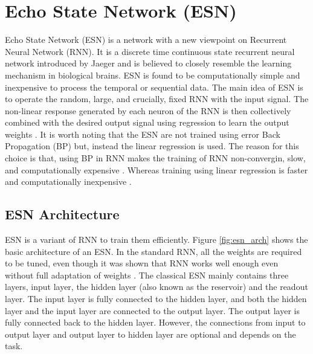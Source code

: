 \section{Echo State Network (ESN)}

Echo State Network (ESN) is a network with a new viewpoint on Recurrent Neural Network (RNN). It is a discrete time continuous state recurrent neural network introduced by Jaeger \cite{esn:jaeger:2001} and is believed to closely resemble the learning mechanism in biological brains. ESN is found to be computationally simple and inexpensive to process the temporal or sequential data. The main idea of ESN is to operate the random, large, and crucially, fixed RNN with the input signal. The non-linear response generated by each neuron of the RNN is then collectively combined with the desired output signal using regression to learn the output weights \cite{esn:jaeger_tutorial, esn:jaeger:2001,esn:scholarpedia:2007}. It is worth noting that the ESN are not trained using error Back Propagation (BP) \cite{back_propagation} but, instead the linear regression is used. The reason for this choice is that, using BP in RNN makes the training of RNN non-convergin, slow, and computationally expensive \cite{bp_in_rnn}. Whereas training using linear regression is faster and computationally inexpensive \cite{esn:practical_guide}.  

\subsection{ESN Architecture}

ESN is a variant of RNN to train them efficiently. Figure \ref{fig:esn_arch} shows the basic architecture of an ESN. In the standard RNN, all the weights are required to be tuned, even though it was shown that RNN works well enough even without full adaptation of weights \cite{esn:practical_guide}. The classical ESN mainly contains three layers, input layer, the hidden layer (also known as the reservoir) and the readout layer. The input layer is fully connected to the hidden layer, and both the hidden layer and the input layer are connected to the output layer. The output layer is fully connected back to the hidden layer. However, the connections from input to output layer and output layer to hidden layer are optional and depends on the task.

